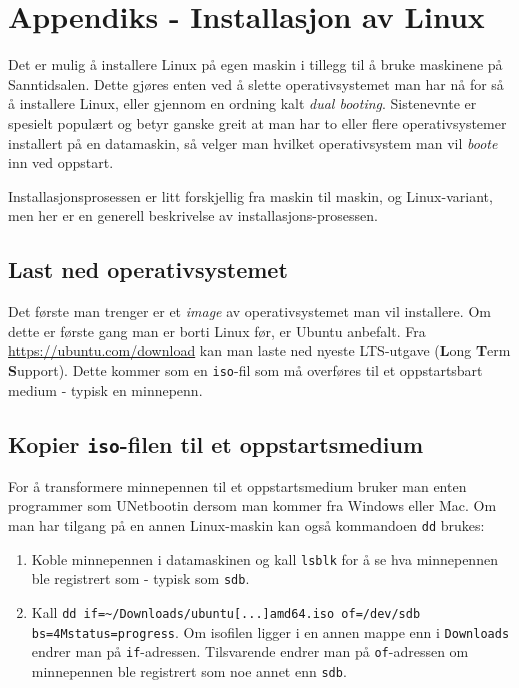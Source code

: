 
\appendix

\section{Appendiks - Installasjon av Linux}\label{4-appendix}

Det er mulig å installere Linux på egen maskin i tillegg til å bruke maskinene på Sanntidsalen. Dette gjøres enten ved å slette operativsystemet man har nå for så å installere Linux, eller gjennom en ordning kalt \textit{dual booting}. Sistenevnte er spesielt populært og betyr ganske greit at man har to eller flere operativsystemer installert på en datamaskin, så velger man hvilket operativsystem man vil \textit{boote} inn ved oppstart.

Installasjonsprosessen er litt forskjellig fra maskin til maskin, og Linux-variant, men her er en generell beskrivelse av installasjons-prosessen.

\subsection{Last ned operativsystemet}\label{app:linux-last}

Det første man trenger er et \textit{image} av operativsystemet man vil installere. Om dette er første gang man er borti Linux før, er Ubuntu anbefalt. Fra \href{https://ubuntu.com/download}{https://ubuntu\newline.com/download} kan man laste ned nyeste LTS-utgave (\textbf{L}ong \textbf{T}erm \textbf{S}upport). Dette kommer som en \verb|iso|-fil som må overføres til et oppstartsbart medium - typisk en minnepenn.

\subsection{Kopier \texttt{iso}-filen til et oppstartsmedium}

For å transformere minnepennen til et oppstartsmedium bruker man enten programmer som UNetbootin dersom man kommer fra Windows eller Mac. Om man har tilgang på en annen Linux-maskin kan også kommandoen \verb|dd| brukes:

\begin{enumerate}
    \item Koble minnepennen i datamaskinen og kall \verb|lsblk| for å se hva minnepennen ble registrert som - typisk som \verb|sdb|.
    \item Kall \verb|dd if=~/Downloads/ubuntu[...]amd64.iso of=/dev/sdb bs=4M|\newline \verb|status=progress|. Om isofilen ligger i en annen mappe enn i \verb|Downloads| endrer man på \verb|if|-adressen. Tilsvarende endrer man på \verb|of|-adressen om minnepennen ble registrert som noe annet enn \verb|sdb|.
\end{enumerate}


